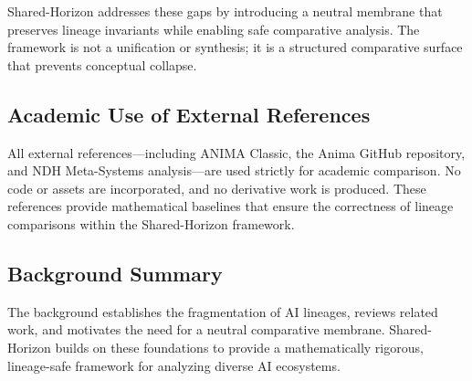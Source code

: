 Shared-Horizon addresses these gaps by introducing a neutral membrane that
preserves lineage invariants while enabling safe comparative analysis. The
framework is not a unification or synthesis; it is a structured comparative
surface that prevents conceptual collapse.

\subsection{Academic Use of External References}

All external references—including ANIMA Classic, the Anima GitHub repository,
and NDH Meta-Systems analysis—are used strictly for academic comparison. No code
or assets are incorporated, and no derivative work is produced. These references
provide mathematical baselines that ensure the correctness of lineage
comparisons within the Shared-Horizon framework.

\subsection{Background Summary}

The background establishes the fragmentation of AI lineages, reviews related
work, and motivates the need for a neutral comparative membrane. Shared-Horizon
builds on these foundations to provide a mathematically rigorous, lineage-safe
framework for analyzing diverse AI ecosystems.

